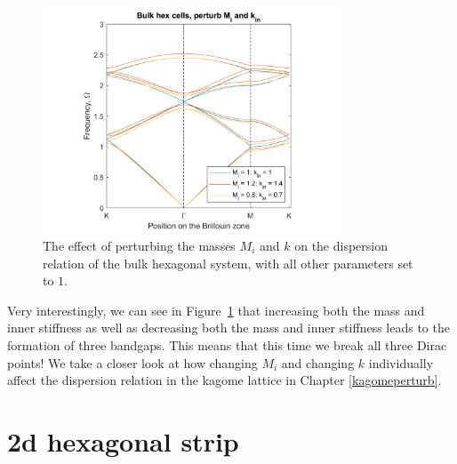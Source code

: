 \begin{figure}[!h]
\centering
\includegraphics[width=0.8\textwidth]{imgs/hexperturb2.png}
\caption{\label{fig:hex2} The effect of perturbing the masses $M_i$ and
  $k$ on the dispersion relation of the bulk hexagonal system, with all other
  parameters set to $1$.}
\end{figure}

Very interestingly, we can see in Figure~\ref{fig:hex2} that increasing both
the mass and inner stiffness as well as decreasing both the mass and inner
stiffness leads to the formation of three bandgaps. This means that this time
we break all three Dirac points! We take a closer look at how changing $M_i$
and changing $k$ individually affect the dispersion relation in the kagome
lattice in Chapter \ref{kagomeperturb}.

\section{2d hexagonal strip}
\label{formstrip}

